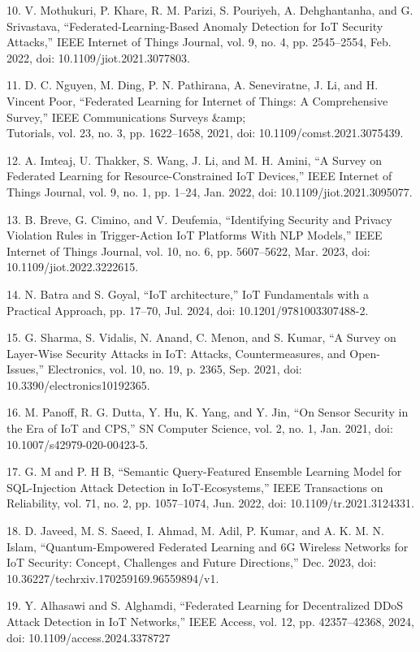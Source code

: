 \begin{noparindent}
10. V. Mothukuri, P. Khare, R. M. Parizi, S. Pouriyeh, A. Dehghantanha,
and G. Srivastava, ``Federated-Learning-Based Anomaly Detection for IoT
Security Attacks,'' IEEE Internet of Things Journal, vol. 9, no. 4, pp.
2545--2554, Feb. 2022, doi: 10.1109/jiot.2021.3077803.

11. D. C. Nguyen, M. Ding, P. N. Pathirana, A. Seneviratne, J. Li, and
H. Vincent Poor, ``Federated Learning for Internet of Things: A
Comprehensive Survey,'' IEEE Communications Surveys \&amp;\\Tutorials,
vol. 23, no. 3, pp. 1622--1658, 2021, doi: 10.1109/comst.2021.3075439.

12. A. Imteaj, U. Thakker, S. Wang, J. Li, and M. H. Amini, ``A Survey
on Federated Learning for Resource-Constrained IoT Devices,'' IEEE
Internet of Things Journal, vol. 9, no. 1, pp. 1--24, Jan. 2022, doi:
10.1109/jiot.2021.3095077.

13. B. Breve, G. Cimino, and V. Deufemia, ``Identifying Security and
Privacy Violation Rules in Trigger-Action IoT Platforms With NLP
Models,'' IEEE Internet of Things Journal, vol. 10, no. 6, pp.
5607--5622, Mar. 2023, doi: 10.1109/jiot.2022.3222615.

14. N. Batra and S. Goyal, ``IoT architecture,'' IoT Fundamentals with a
Practical Approach, pp. 17--70, Jul. 2024, doi: 10.1201/9781003307488-2.

15. G. Sharma, S. Vidalis, N. Anand, C. Menon, and S. Kumar, ``A Survey
on Layer-Wise Security Attacks in IoT: Attacks, Countermeasures, and
Open-Issues,'' Electronics, vol. 10, no. 19, p. 2365, Sep. 2021, doi:
10.3390/electronics10192365.

16. M. Panoff, R. G. Dutta, Y. Hu, K. Yang, and Y. Jin, ``On Sensor
Security in the Era of IoT and CPS,'' SN Computer Science, vol. 2, no.
1, Jan. 2021, doi: 10.1007/s42979-020-00423-5.

17. G. M and P. H B, ``Semantic Query-Featured Ensemble Learning Model
for SQL-Injection Attack Detection in IoT-Ecosystems,'' IEEE
Transactions on Reliability, vol. 71, no. 2, pp. 1057--1074, Jun. 2022,
doi: 10.1109/tr.2021.3124331.

18. D. Javeed, M. S. Saeed, I. Ahmad, M. Adil, P. Kumar, and A. K. M. N.
Islam, ``Quantum-Empowered Federated Learning and 6G Wireless Networks
for IoT Security: Concept, Challenges and Future Directions,'' Dec.
2023, doi: 10.36227/techrxiv.170259169.96559894/v1.

19. Y. Alhasawi and S. Alghamdi, ``Federated Learning for Decentralized
DDoS Attack Detection in IoT Networks,'' IEEE Access, vol. 12, pp.
42357--42368, 2024, doi: 10.1109/access.2024.3378727


\end{noparindent}
